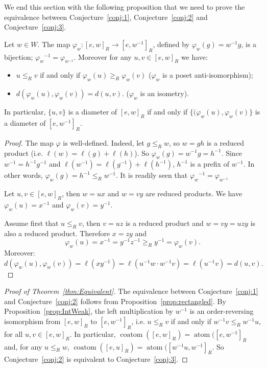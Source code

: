 \documentclass[ALCO,Unicode]{cedram}
\theoremstyle{definition}
\newcommand{\coatom}{\operatorname{coatom}}
\newcommand{\atom}{\operatorname{atom}}
\begin{document}
We end this section with the following proposition that we need to prove the equivalence between Conjecture~\ref{conj:1},  Conjecture~\ref{conj:2} and Conjecture~\ref{conj:3}.

\begin{prop}\label{prop:IntWeak} Let $w\in W$. The map $\varphi_w: [e,w]_R\to [e,w^{-1}]_R$, defined by $\varphi_w(g)=w^{-1}g$, is a bijection; $\varphi_w{}^{-1} = \varphi_{w^{-1}}$. Moreover for any $u,v\in [e,w]_R$ we have: 
\begin{itemize}
\item $u\leq_R v$ if and only if $\varphi_w(u)\geq_R\varphi_w(v)$ ($\varphi_w$ is a poset anti-isomorphism);
\item  $d(\varphi_w(u),\varphi_w(v))=d(u,v).$ ($\varphi_w$ is an isometry).
\end{itemize}
In particular, $\{u,v\}$ is a diameter of $ [e,w]_R$ if and only if $\{(\varphi_w(u),\varphi_w(v)\}$ is a diameter of  $[e,w^{-1}]_R$.
\end{prop}
 \begin{proof} The map $\varphi$ is well-defined. Indeed, let $g\leq_R w$, so $w=gh$ is a reduced product (i.e.  $\ell(w)=\ell(g)+\ell(h)$). So $\varphi_w(g)= w^{-1}g=h^{-1}$. Since $w^{-1}=h^{-1}g^{-1}$ and  $\ell(w^{-1})=\ell(g^{-1})+\ell(h^{-1})$, $h^{-1}$ is a prefix of $w^{-1}$. In other words, $\varphi_w(g)=h^{-1}\leq_R w^{-1}$. It is readily seen that $\varphi_w{}^{-1} = \varphi_{w^{-1}}$ 
 
Let $u,v\in [e,w]_R$, then $w=ux$ and $w=vy$ are reduced products. We have $\varphi_w(u)=x^{-1}$ and $\varphi_w(v)=y^{-1}$. 

Assume first that $u\leq_R v$, then $v=uz$ is a reduced product and $w=vy=uzy$ is also a reduced product. Therefore $x=zy$ and 
$$
\varphi_w(u)=x^{-1}=y^{-1}z^{-1}\geq_R y^{-1}=\varphi_w(v). 
$$
Moreover: $d(\varphi_w(u),\varphi_w(v))=\ell(xy^{-1})=\ell(u^{-1}w\cdot w^{-1}v)=\ell(u^{-1}v)=d(u,v). $
 \end{proof}
 
 \begin{proof}[Proof of Theorem~\ref{thm:Equivalent}] The equivalence between Conjecture~\ref{conj:1} and Conjecture~\ref{conj:2} follows from Proposition~\ref{prop:rectangled}. By  Proposition~\ref{prop:IntWeak}, the left multiplication by $w^{-1}$ is an order-reversing isomorphism from $[e,w]_R$ to $[e,w^{-1}]_R$, i.e.  $u\leq_R v$ if and only if $w^{-1}v\leq_R w^{-1}u$, for all $u,v\in [e,w]_R$. In particular,  $\coatom([e,w]_R)=\atom([e,w^{-1}]_R$ and, for any $u\leq_R w$, $\coatom([e,u]_R)=\atom([w^{-1}u,w^{-1}]_R$. So Conjecture~\ref{conj:2} is equivalent to Conjecture~\ref{conj:3}.
 \end{proof}
 
\end{document}
